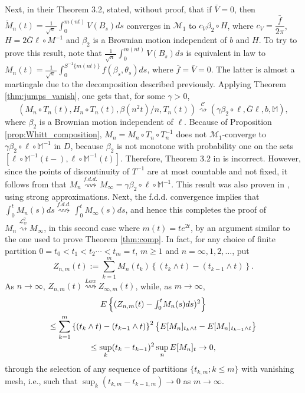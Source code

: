 \documentclass[final]{amsart}
\theoremstyle{definition}
\numberwithin{equation}{section}
\def\disp{\displaystyle}
\newcommand{\dM}{\ensuremath{\mathbb{M}}}
\newcommand{\cL}{\ensuremath{\mathcal{L}}}
\newcommand{\cM}{\ensuremath{\mathcal{M}}}
\def\sn{\sqrt{n}\; }
\begin{document}
Next, in their Theorem 3.2,  \citet{Kasahara/Kotani:1979} stated, without proof, that if $\bar V=0$,
then $\tilde M_n(t) = \frac{1}{\sn}\int_0^{m(nt)}V(B_s)ds$ converges in  $\cM_1$ to $c_V \beta_2\circ H$, where $c_V=\dfrac{\bar f}{2\pi}$,
$H = 2 \bar G \ell \circ M^{-1}$ and $\beta_2$ is a Brownian motion independent of $b$ and $H$. To try to prove this result, note that
$\frac{1}{\sn}\int_0^{m(nt)}V(B_s)ds$ is equivalent in law to
$\disp M_n(t) = \frac{1}{\sn}\int_0^{S^{-1}\{m(nt)\}} f(\beta_s,\theta_s) ds$,
where $\bar f = \bar V=0$. The latter is almost a martingale due to the decomposition described previously.
Applying Theorem \ref{thm:jumps_vanish}, one gets that, for some $\gamma>0$,
$$
\left(M_n\circ T_n(t), H_n\circ T_n(t), \beta(n^2t)/n,T_n(t)\right)
\stackrel{\mathcal{C}}{\rightsquigarrow}\left(\gamma\beta_2\circ \ell, \bar G \ell, b,\dM\right),
$$
where $\beta_2$ is a Brownian motion independent of $\ell$. Because of Proposition \ref{prop:Whitt_composition},
$M_n = M_n\circ T_n\circ T_n^{-1}$ does not $\cM_1$-converge to $\gamma\beta_2\circ \ell\circ \dM^{-1}$ in $D$,
because $\beta_2$ is not monotone with probability one on the sets $[ \ell\circ \dM^{-1}(t-), \ell\circ \dM^{-1}(t)]$. Therefore, Theorem 3.2 in
\citet{Kasahara/Kotani:1979} is incorrect.
However, since the points of discontinuity of $T^{-1}$ are at most countable and not fixed, it follows from
\citet[Theorem 12.4.1]{Whitt:2002} that $M_n \stackrel{f.d.d.}{\rightsquigarrow} M_\infty = \gamma \beta_2\circ \ell\circ \dM^{-1}$.
This result was also proven in \citet{Csaki/Foldes/Hu:2004}, using strong approximations.
Next, the f.d.d. convergence implies that  $\int_0^t M_n(s)ds \stackrel{f.d.d.}{\rightsquigarrow} \int_0^t M_\infty(s)ds$,
and hence this completes the proof of $M_n \stackrel{\cL^2_w}{\rightsquigarrow} M_\infty$,
in this second case where $m(t)=te^{2t}$,
by an argument similar to the one used to prove Theorem \ref{thm:comp}.
In fact, for any choice of finite partition $0=t_0< t_1< t_2 \cdots <t_m=t$, $m\ge1$ and $n=\infty,1,2,\dots$, put
$$
Z_{n,m}(t):= \sum_{k=1}^m M_n(t_k)\left\{(t_k\wedge t)-(t_{k-1}\wedge t)\right\}.
$$
As $n\to\infty$, $Z_{n,m}(t)\stackrel{Law}{\rightsquigarrow}Z_{\infty,m}(t)$, while, as $m\to\infty$,
\begin{multline*}
E\left\{(Z_{n,m}(t) - \hbox{$\int_0^t$} M_n(s)ds)^2\right\} \\
\le \sum_{k=1}^m\left\{(t_k\wedge t)-(t_{k-1}\wedge t)\right\}^2\left\{E[M_n]_{t_k\wedge t}-E[M_n]_{t_{k-1}\wedge t}\right\}\\
\le \sup_k(t_k-t_{k-1})^2\sup_nE[M_n]_t\to0,
\end{multline*}
through the selection of any sequence of partitions $\{t_{k,m};k\le m\}$ with vanishing mesh, i.e.,
such that $\sup_k(t_{k,m}-t_{k-1,m})\to0$ as $m\to\infty$.
\end{document}
